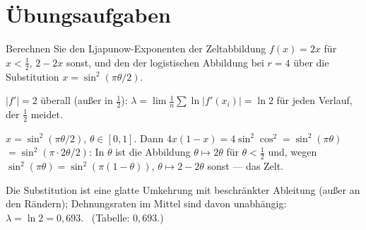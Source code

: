 \section{Übungsaufgaben}

\begin{aufgabe}
Berechnen Sie den Ljapunow-Exponenten der Zeltabbildung $f(x) = 2x$ für $x < \tfrac12$, $2 - 2x$ sonst, und den der logistischen Abbildung bei $r = 4$ über die Substitution $x = \sin^{2}(\pi\theta/2)$.

\loesung
{}
$|f'| = 2$ überall (außer in $\tfrac12$): $\lambda = \lim\frac1n\sum\ln|f'(x_i)| = \ln2$ für jeden Verlauf, der $\tfrac12$ meidet. \checkmark

$x = \sin^{2}(\pi\theta/2)$, $\theta\in[0,1]$. Dann $4x(1-x) = 4\sin^{2}\cos^{2} = \sin^{2}(\pi\theta)$ $= \sin^{2}(\pi\cdot2\theta/2)$: In $\theta$ ist die Abbildung $\theta\mapsto 2\theta$ für $\theta < \tfrac12$ und, wegen $\sin^{2}(\pi\theta) = \sin^{2}(\pi(1-\theta))$, $\theta\mapsto 2 - 2\theta$ sonst --- das Zelt.

Die Substitution ist eine glatte Umkehrung mit beschränkter Ableitung (außer an den Rändern); Dehnungsraten im Mittel sind davon unabhängig: $\lambda = \ln 2 = 0{,}693$. \checkmark\ (Tabelle: $0{,}693$.)

\begin{center}
\begin{minipage}{0.88\textwidth}
\end{minipage}
\end{center}
\end{aufgabe}

